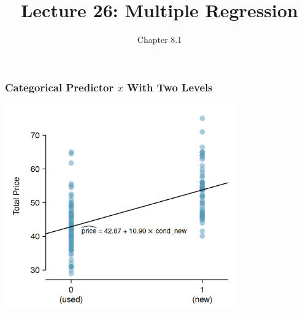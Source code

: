\documentclass[handout]{beamer}
\title{Lecture 26: Multiple Regression}
\author{Chapter 8.1}
\date{}
\newcommand{\blue}[1]{\textcolor{blue2}{#1}}
\begin{document}
\begin{frame}
\titlepage
\end{frame}


%
%


\begin{frame}[fragile]
\frametitle{Categorical Predictor $x$ With Two Levels}

\begin{center}
\includegraphics[width=0.75\textwidth]{figure/mario_kart.png}
\end{center}

\end{frame}
\end{document}
